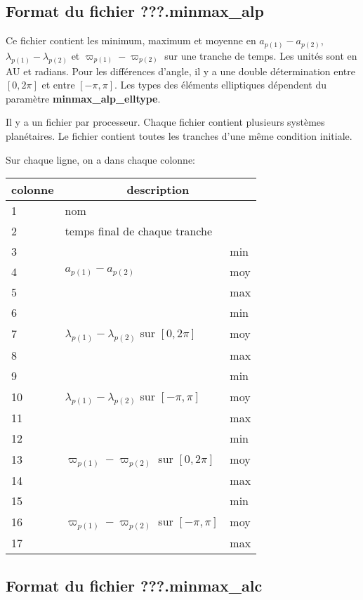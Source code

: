 \documentclass[11pt]{article}
\begin{document}
\subsection{Format du fichier {\bf ???.minmax\_alp} }

Ce fichier contient les minimum, maximum et moyenne en $a_{p(1)}-a_{p(2)}$, $\lambda_{p(1)}-\lambda_{p(2)}$ et $\varpi_{p(1)}-\varpi_{p(2)}$ sur une tranche de temps. Les unit\'es sont en AU et radians. Pour les diff\'erences d'angle, il y a une double d\'etermination entre $[0,2\pi]$ et entre $[-\pi, \pi]$.
Les types des \'el\'ements elliptiques d\'ependent du param\`etre  {\bf minmax\_alp\_elltype}.

 Il y a un fichier par processeur. Chaque fichier contient plusieurs syst\`emes plan\'etaires. Le fichier contient toutes les tranches d'une m\^eme  condition initiale.


Sur chaque ligne, on a dans chaque colonne: 

\begin{tabularx}{\textwidth}{|l|l|X|}
 \hline
 colonne &      \multicolumn{2}{c|}{description} \\ \hline
1  &    \multicolumn{2}{l|}{nom} \\ \hline
2  &    \multicolumn{2}{l|}{temps final de chaque tranche} \\ \hline
3 &    & min\\
4 &  $a_{p(1)}-a_{p(2)}$ & moy\\
5 & &   max\\ \hline
6 & &   min\\
7 & $\lambda_{p(1)}-\lambda_{p(2)}$ sur $[0,2\pi]$&moy\\
8 &    & max\\ \hline
9 &    & min\\
10& $\lambda_{p(1)}-\lambda_{p(2)}$ sur $[-\pi,\pi]$ & moy\\
11 & &    max\\ \hline
12 & &    min\\
13 &   $\varpi_{p(1)}-\varpi_{p(2)}$ sur $[0,2\pi]$ & moy\\
14 & &    max\\ \hline
15 & &    min\\
16 & $\varpi_{p(1)}-\varpi_{p(2)}$ sur $[-\pi,\pi]$ & moy\\
17 & &    max\\ \hline
\end{tabularx}

\subsection{Format du fichier {\bf ???.minmax\_alc} }
\end{document}
